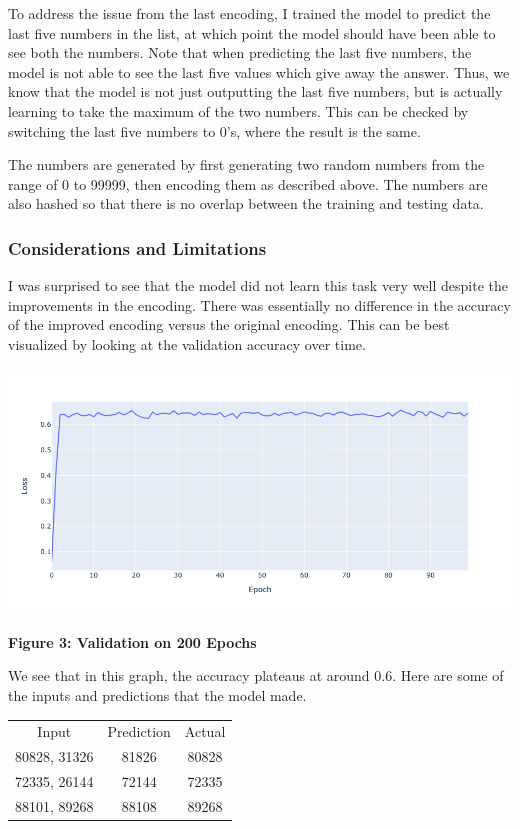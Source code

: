 \documentclass{article}
\begin{document}
To address the issue from the last encoding, I trained the model to predict the last five numbers in the list, at which point the model should have been able to see both the numbers. Note that when predicting the last five numbers, the model is not able to see the last five values which give away the answer. Thus, we know that the model is not just outputting the last five numbers, but is actually learning to take the maximum of the two numbers. This can be checked by switching the last five numbers to 0's, where the result is the same.

The numbers are generated by first generating two random numbers from the range of 0 to 99999, then encoding them as described above. The numbers are also hashed so that there is no overlap between the training and testing data.

\subsubsection{Considerations and Limitations}
I was surprised to see that the model did not learn this task very well despite the improvements in the encoding. There was essentially no difference in the accuracy of the improved encoding versus the original encoding. This can be best visualized by looking at the validation accuracy over time. 

\begin{center}
    \includegraphics[scale=0.4]{encoding_answer.png}

    \textbf{Figure 3: Validation on 200 Epochs}

\end{center}

We see that in this graph, the accuracy plateaus at around 0.6. Here are some of the inputs and predictions that the model made.

\begin{center}
    \begin{tabular} {c c c}
        Input & Prediction & Actual \\
        80828, 31326 & 81826 & 80828 \\
        72335, 26144 & 72144 & 72335 \\
        88101, 89268 & 88108 & 89268
    \end{tabular}
\end{center}
\end{document}

